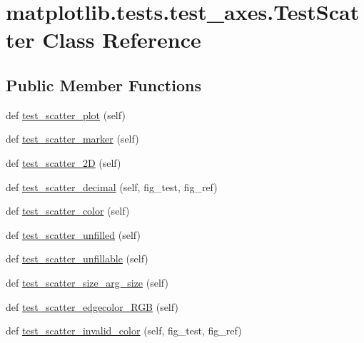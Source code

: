 \hypertarget{classmatplotlib_1_1tests_1_1test__axes_1_1TestScatter}{}\section{matplotlib.\+tests.\+test\+\_\+axes.\+Test\+Scatter Class Reference}
\label{classmatplotlib_1_1tests_1_1test__axes_1_1TestScatter}
\subsection*{Public Member Functions}
\begin{DoxyCompactItemize}
\item 
def \hyperlink{classmatplotlib_1_1tests_1_1test__axes_1_1TestScatter_a6e94e8340c6d8369f558e298f319134d}{test\+\_\+scatter\+\_\+plot} (self)
\item 
def \hyperlink{classmatplotlib_1_1tests_1_1test__axes_1_1TestScatter_a328f8cdc7dbe1998029eeebbec84a071}{test\+\_\+scatter\+\_\+marker} (self)
\item 
def \hyperlink{classmatplotlib_1_1tests_1_1test__axes_1_1TestScatter_a77baa3bd96f94267dae1511e3674d89f}{test\+\_\+scatter\+\_\+2D} (self)
\item 
def \hyperlink{classmatplotlib_1_1tests_1_1test__axes_1_1TestScatter_a1eb0f1ad0c100bf9bf26b8438ca261aa}{test\+\_\+scatter\+\_\+decimal} (self, fig\+\_\+test, fig\+\_\+ref)
\item 
def \hyperlink{classmatplotlib_1_1tests_1_1test__axes_1_1TestScatter_a27e93858171eace001933351d70fe13b}{test\+\_\+scatter\+\_\+color} (self)
\item 
def \hyperlink{classmatplotlib_1_1tests_1_1test__axes_1_1TestScatter_a2b25c1876cfb1e4d6c6a09f90c5eba20}{test\+\_\+scatter\+\_\+unfilled} (self)
\item 
def \hyperlink{classmatplotlib_1_1tests_1_1test__axes_1_1TestScatter_a261ffb92f82ffa7cc525bf15dd6de33d}{test\+\_\+scatter\+\_\+unfillable} (self)
\item 
def \hyperlink{classmatplotlib_1_1tests_1_1test__axes_1_1TestScatter_aa231029f52ce9e7f269927abe0831507}{test\+\_\+scatter\+\_\+size\+\_\+arg\+\_\+size} (self)
\item 
def \hyperlink{classmatplotlib_1_1tests_1_1test__axes_1_1TestScatter_ad20bc347db9acedb6666c2e7e9e6779b}{test\+\_\+scatter\+\_\+edgecolor\+\_\+\+R\+GB} (self)
\item 
def \hyperlink{classmatplotlib_1_1tests_1_1test__axes_1_1TestScatter_a8abf2d70df7f6a7307b8d7d84bd90fda}{test\+\_\+scatter\+\_\+invalid\+\_\+color} (self, fig\+\_\+test, fig\+\_\+ref)

\end{DoxyCompactItemize}
